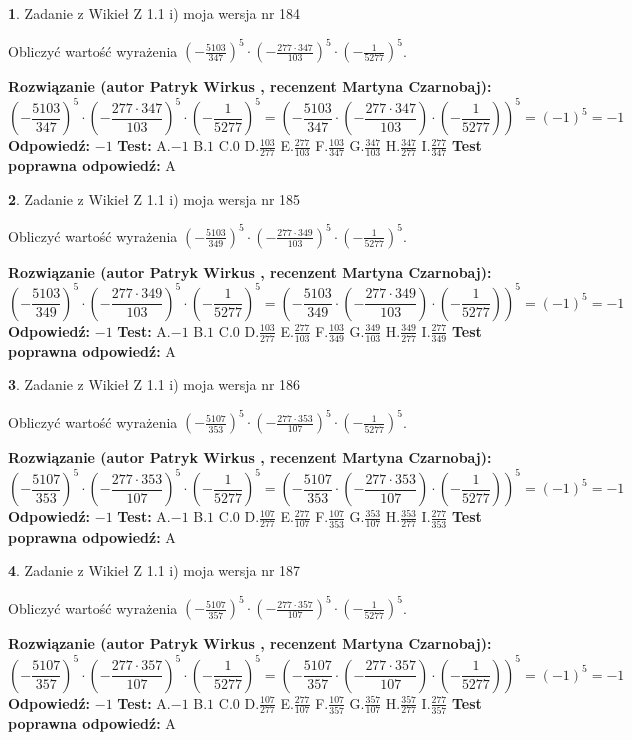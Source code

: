 \documentclass[12pt, a4paper]{article}
\theoremstyle{definition} %
\newtheorem{zad}{}
\newcommand{\zadStart}[1]{\begin{zad}#1\newline}
\newcommand{\zadStop}{\end{zad}}
\newcommand{\rozwStart}[2]{\noindent \textbf{Rozwiązanie (autor #1 , recenzent #2): }\newline}
\newcommand{\rozwStop}{\newline}
\newcommand{\odpStart}{\noindent \textbf{Odpowiedź:}\newline}
\newcommand{\odpStop}{\newline}
\newcommand{\testStart}{\noindent \textbf{Test:}\newline}
\newcommand{\testStop}{\newline}
\newcommand{\kluczStart}{\noindent \textbf{Test poprawna odpowiedź:}\newline}
\newcommand{\kluczStop}{\newline}
\begin{document}
\zadStart{Zadanie z Wikieł Z 1.1 i) moja wersja nr 184}

Obliczyć wartość wyrażenia $(-\frac{5103}{347})^{5} \cdot (-\frac{277 \cdot 347}{103})^{5} \cdot (-\frac{1}{5277})^{5}$.
\zadStop
\rozwStart{Patryk Wirkus}{Martyna Czarnobaj}
$$(-\frac{5103}{347})^{5} \cdot (-\frac{277 \cdot 347}{103})^{5} \cdot (-\frac{1}{5277})^{5} = (-\frac{5103}{347} \cdot (-\frac{277 \cdot 347}{103}) \cdot (-\frac{1}{5277}))^{5} = (-1)^{5} = -1$$
\rozwStop
\odpStart
$-1$
\odpStop
\testStart
A.$-1$ B.$1$ C.$0$ D.$\frac{103}{277}$ E.$\frac{277}{103}$
F.$\frac{103}{347}$ G.$\frac{347}{103}$
H.$\frac{347}{277}$
I.$\frac{277}{347}$
\testStop
\kluczStart
A
\kluczStop



\zadStart{Zadanie z Wikieł Z 1.1 i) moja wersja nr 185}

Obliczyć wartość wyrażenia $(-\frac{5103}{349})^{5} \cdot (-\frac{277 \cdot 349}{103})^{5} \cdot (-\frac{1}{5277})^{5}$.
\zadStop
\rozwStart{Patryk Wirkus}{Martyna Czarnobaj}
$$(-\frac{5103}{349})^{5} \cdot (-\frac{277 \cdot 349}{103})^{5} \cdot (-\frac{1}{5277})^{5} = (-\frac{5103}{349} \cdot (-\frac{277 \cdot 349}{103}) \cdot (-\frac{1}{5277}))^{5} = (-1)^{5} = -1$$
\rozwStop
\odpStart
$-1$
\odpStop
\testStart
A.$-1$ B.$1$ C.$0$ D.$\frac{103}{277}$ E.$\frac{277}{103}$
F.$\frac{103}{349}$ G.$\frac{349}{103}$
H.$\frac{349}{277}$
I.$\frac{277}{349}$
\testStop
\kluczStart
A
\kluczStop



\zadStart{Zadanie z Wikieł Z 1.1 i) moja wersja nr 186}

Obliczyć wartość wyrażenia $(-\frac{5107}{353})^{5} \cdot (-\frac{277 \cdot 353}{107})^{5} \cdot (-\frac{1}{5277})^{5}$.
\zadStop
\rozwStart{Patryk Wirkus}{Martyna Czarnobaj}
$$(-\frac{5107}{353})^{5} \cdot (-\frac{277 \cdot 353}{107})^{5} \cdot (-\frac{1}{5277})^{5} = (-\frac{5107}{353} \cdot (-\frac{277 \cdot 353}{107}) \cdot (-\frac{1}{5277}))^{5} = (-1)^{5} = -1$$
\rozwStop
\odpStart
$-1$
\odpStop
\testStart
A.$-1$ B.$1$ C.$0$ D.$\frac{107}{277}$ E.$\frac{277}{107}$
F.$\frac{107}{353}$ G.$\frac{353}{107}$
H.$\frac{353}{277}$
I.$\frac{277}{353}$
\testStop
\kluczStart
A
\kluczStop



\zadStart{Zadanie z Wikieł Z 1.1 i) moja wersja nr 187}

Obliczyć wartość wyrażenia $(-\frac{5107}{357})^{5} \cdot (-\frac{277 \cdot 357}{107})^{5} \cdot (-\frac{1}{5277})^{5}$.
\zadStop
\rozwStart{Patryk Wirkus}{Martyna Czarnobaj}
$$(-\frac{5107}{357})^{5} \cdot (-\frac{277 \cdot 357}{107})^{5} \cdot (-\frac{1}{5277})^{5} = (-\frac{5107}{357} \cdot (-\frac{277 \cdot 357}{107}) \cdot (-\frac{1}{5277}))^{5} = (-1)^{5} = -1$$
\rozwStop
\odpStart
$-1$
\odpStop
\testStart
A.$-1$ B.$1$ C.$0$ D.$\frac{107}{277}$ E.$\frac{277}{107}$
F.$\frac{107}{357}$ G.$\frac{357}{107}$
H.$\frac{357}{277}$
I.$\frac{277}{357}$
\testStop
\kluczStart
A
\kluczStop
\end{document}
